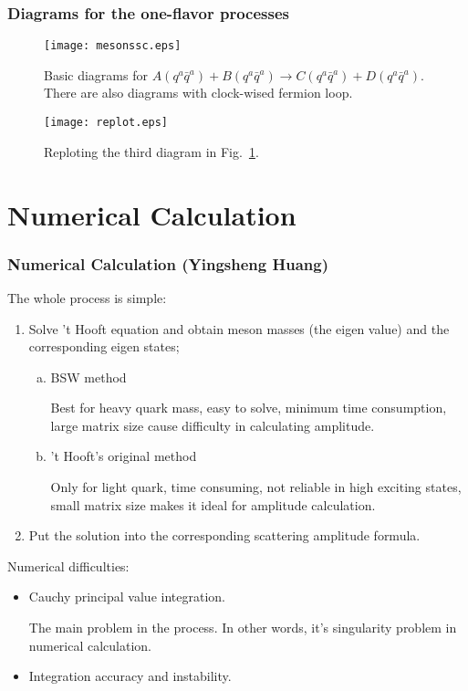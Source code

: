 \documentclass[8pt]{beamer}
\begin{document}
\begin{frame}
	\frametitle{Diagrams for the one-flavor processes}
	\begin{figure}[hbt]
		\begin{center}
			\texttt{[image: mesonssc.eps]}\\
			\caption{Basic diagrams for $A(q^a\bar q^a)+B(q^a\bar q^a)\rightarrow C(q^a\bar q^a)+D(q^a\bar q^a)$.
				There are also diagrams with clock-wised fermion loop.}\label{mesonssc}
		\end{center}
	\end{figure}

	\begin{figure}[hbt]
		\begin{center}
			\texttt{[image: replot.eps]}\\
			\caption{Reploting the third diagram in Fig.~\ref{mesonssc}.}\label{replot}
		\end{center}
	\end{figure}





\end{frame}

\section{Numerical Calculation}
\begin{frame}
	\frametitle{Numerical Calculation (Yingsheng Huang)}
	The whole process is simple:
	\begin{enumerate}
		\item Solve 't Hooft equation and obtain meson masses (the eigen value) and the corresponding eigen states;
		      \begin{enumerate}[(a)]
			      \item BSW method

			            Best for heavy quark mass, easy to solve, minimum time consumption, large matrix size cause difficulty in calculating amplitude.
			      \item 't Hooft's original method

			            Only for light quark, time consuming, not reliable in high exciting states, small matrix size makes it ideal for amplitude calculation.
		      \end{enumerate}
		\item Put the solution into the corresponding scattering amplitude formula.
	\end{enumerate}
	Numerical difficulties:
	\begin{itemize}
		\item Cauchy principal value integration.

		      The main problem in the process. In other words, it's singularity problem in numerical calculation.
		\item Integration accuracy and instability.
	\end{itemize}
\end{frame}
\end{document}
